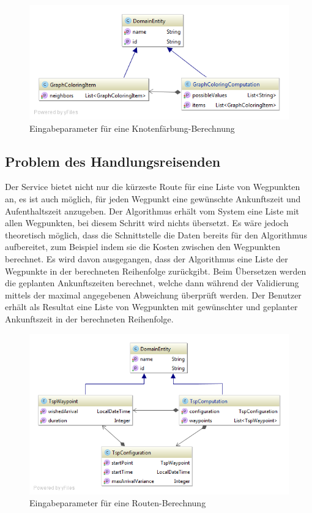 \begin{figure}[h]
\centering
\includegraphics[scale=0.5]{images/probleme/graphcoloring.png}
\caption[Eingabeparameter für eine Knotenfärbung-Berechnung]{Eingabeparameter für eine Knotenfärbung-Berechnung \selfmade{}}
\label{fig:graphcoloring_input}
\end{figure}

%
%
%
%

\subsection{Problem des Handlungsreisenden}
Der Service bietet nicht nur die kürzeste Route für eine Liste von Wegpunkten an, es ist auch möglich, für jeden Wegpunkt eine gewünschte Ankunftszeit und Aufenthaltszeit anzugeben. Der 
Algorithmus erhält vom System eine Liste mit allen Wegpunkten, bei diesem Schritt wird nichts übersetzt. Es wäre jedoch theoretisch möglich, dass die Schnittstelle die Daten bereits für den 
Algorithmus aufbereitet, zum Beispiel indem sie die Kosten zwischen den Wegpunkten berechnet. Es wird davon ausgegangen, dass der Algorithmus eine Liste der Wegpunkte in der 
berechneten Reihenfolge zurückgibt. Beim Übersetzen werden die geplanten Ankunftszeiten berechnet, welche dann während der Validierung mittels der maximal angegebenen Abweichung 
überprüft werden. Der Benutzer erhält als Resultat eine Liste von Wegpunkten mit gewünschter und geplanter Ankunftszeit in der berechneten Reihenfolge.

\begin{figure}[h]
\centering
\includegraphics[scale=0.5]{images/probleme/tsp.png}
\caption[Eingabeparameter für eine Routen-Berechnung]{Eingabeparameter für eine Routen-Berechnung \selfmade{}}
\label{fig:tsp_input}
\end{figure}

